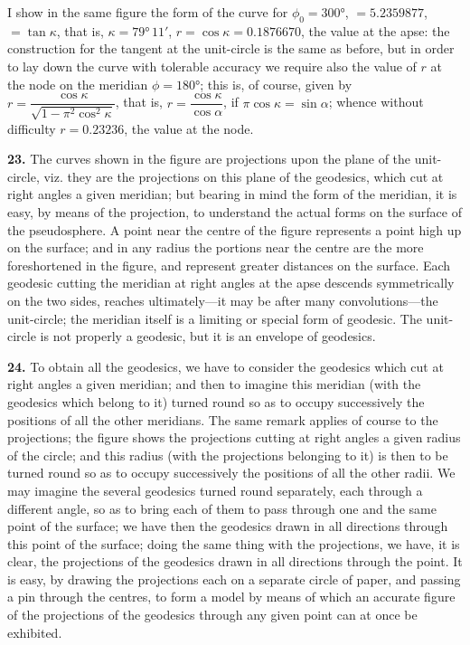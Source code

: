 \documentclass[12pt,a4paper]{article}
\theoremstyle{definition}
\begin{document}
I show in the same figure the form of the curve for $\phi_0 = 300°$, $= 5.2359877$, $= \tan\kappa$, that is, $\kappa = 79°\,11'$, $r = \cos\kappa = 0.1876670$, the value at the apse: the construction for the tangent at the unit-circle is the same as before, but in order to lay down the curve with tolerable accuracy we require also the value of $r$ at the node on the meridian $\phi = 180°$; this is, of course, given by $r = \dfrac{\cos\kappa}{\sqrt{1 - \pi^2\cos^2\kappa}}$, that is, $r = \dfrac{\cos\kappa}{\cos\alpha}$, if $\pi\cos\kappa = \sin\alpha$; whence without difficulty $r = 0.23236$, the value at the node.

\noindent\textbf{23.} The curves shown in the figure are projections upon the plane of the unit-circle, viz. they are the projections on this plane of the geodesics, which cut at right angles a given meridian; but bearing in mind the form of the meridian, it is easy, by means of the projection, to understand the actual forms on the surface of the pseudosphere. A point near the centre of the figure represents a point high up on the surface; and in any radius the portions near the centre are the more foreshortened in the figure, and represent greater distances on the surface. Each geodesic cutting the meridian at right angles at the apse descends symmetrically on the two sides, reaches ultimately---it may be after many convolutions---the unit-circle; the meridian itself is a limiting or special form of geodesic. The unit-circle is not properly a geodesic, but it is an envelope of geodesics.

\noindent\textbf{24.} To obtain all the geodesics, we have to consider the geodesics which cut at right angles a given meridian; and then to imagine this meridian (with the geodesics which belong to it) turned round so as to occupy successively the positions of all the other meridians. The same remark applies of course to the projections; the figure shows the projections cutting at right angles a given radius of the circle; and this radius (with the projections belonging to it) is then to be turned round so as to occupy successively the positions of all the other radii. We may imagine the several geodesics turned round separately, each through a different angle, so as to bring each of them to pass through one and the same point of the surface; we have then the geodesics drawn in all directions through this point of the surface; doing the same thing with the projections, we have, it is clear, the projections of the geodesics drawn in all directions through the point. It is easy, by drawing the projections each on a separate circle of paper, and passing a pin through the centres, to form a model by means of which an accurate figure of the projections of the geodesics through any given point can at once be exhibited.
\end{document}

